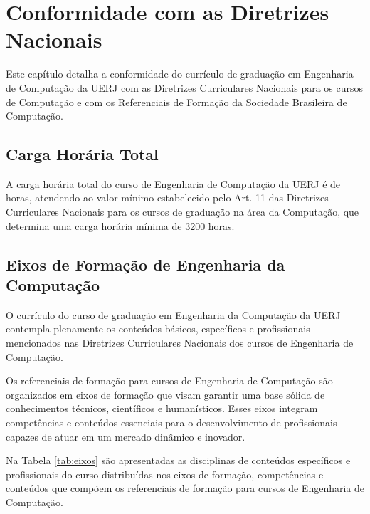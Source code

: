 \chapter{Conformidade com as Diretrizes Nacionais}
\thispagestyle{plain}

Este capítulo detalha a conformidade do currículo de graduação em Engenharia de Computação da UERJ com as Diretrizes Curriculares Nacionais para os cursos de Computação e com os  Referenciais de Formação da Sociedade Brasileira de Computação.


\section{Carga Horária Total}

A carga horária total do curso de Engenharia de Computação da UERJ é de \tHorasCurso horas, atendendo ao valor mínimo estabelecido pelo Art. 11 das Diretrizes Curriculares Nacionais para os cursos de graduação na área da Computação, que determina uma carga horária mínima de 3200 horas.


\section{Eixos de Formação de Engenharia da Computação}

O currículo do curso de graduação em Engenharia da Computação da UERJ contempla plenamente os conteúdos básicos, específicos e profissionais mencionados nas Diretrizes Curriculares Nacionais dos cursos de Engenharia de Computação.

Os referenciais de formação para cursos de Engenharia de Computação são organizados em eixos de formação que visam garantir uma base sólida de conhecimentos técnicos, científicos e humanísticos. Esses eixos integram competências e conteúdos essenciais para o desenvolvimento de profissionais capazes de atuar em um mercado dinâmico e inovador.

Na Tabela \ref{tab:eixos} são apresentadas as disciplinas de conteúdos específicos e profissionais do curso distribuídas nos eixos de formação, competências e conteúdos que compõem os referenciais de formação para cursos de Engenharia de Computação.



